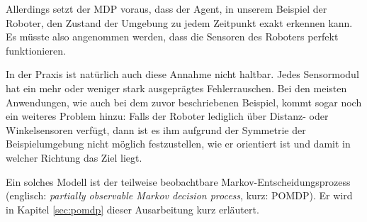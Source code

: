 \documentclass[a4paper]{IEEEtran}
\begin{document}
Allerdings setzt der MDP voraus, dass der Agent, in unserem Beispiel der Roboter, den Zustand der Umgebung zu jedem Zeitpunkt exakt erkennen kann. Es müsste also angenommen werden, dass die Sensoren des Roboters perfekt funktionieren.

In der Praxis ist natürlich auch diese Annahme nicht haltbar. Jedes Sensormodul hat ein mehr oder weniger stark ausgeprägtes Fehlerrauschen. Bei den meisten Anwendungen, wie auch bei dem zuvor beschriebenen Beispiel, kommt sogar noch ein weiteres Problem hinzu: Falls der Roboter lediglich über Distanz- oder Winkelsensoren verfügt, dann ist es ihm aufgrund der Symmetrie der Beispielumgebung nicht möglich festzustellen, wie er orientiert ist und damit in welcher Richtung das Ziel liegt.

Ein solches Modell ist der teilweise beobachtbare Markov-Entscheidungsprozess (englisch: \emph{partially observable Markov decision process}, kurz: POMDP). Er wird in Kapitel \ref{sec:pomdp} dieser Ausarbeitung kurz erläutert.
\end{document}

